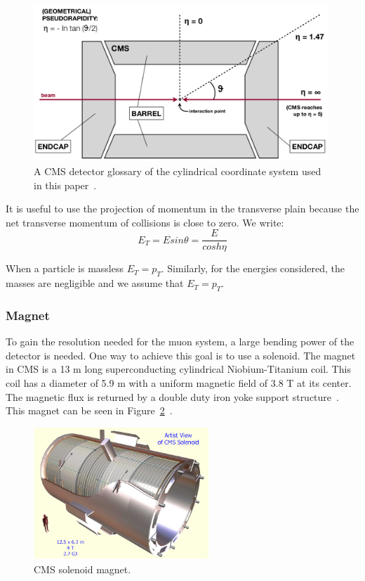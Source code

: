 \begin{figure}[htb]
\centering
\includegraphics[width=0.99\textwidth]{Experiment/DetectorGlossary.png}
\caption{A CMS detector glossary of the cylindrical coordinate system used in this paper~\cite{Pandolfi_talk}.}
\label{fig:CMS_detector_glossary}
\end{figure}

It is useful to use the projection of momentum in the transverse plain because the net transverse momentum of collisions is close to zero.  We write:
\begin{equation} E_T = E sin \theta = \dfrac{E}{cosh\eta} \label{eq:transverse_energy}\end{equation}

When a particle is massless $E_T=p_T$.  Similarly, for the energies considered, the masses are negligible and we assume that $E_T=p_T$.

\subsubsection{Magnet}

To gain the resolution needed for the muon system, a large bending power of the detector is needed.  One way to achieve this goal is to use a solenoid.  The magnet in CMS is a 13 m long superconducting cylindrical Niobium-Titanium coil.  This coil has a diameter of 5.9 m with a uniform magnetic field of 3.8 T at its center.  The magnetic flux is returned by a double duty iron yoke support structure~\cite{Magnet_CMS}. This magnet can be seen in Figure~\ref{fig:CMS_solenoid_magnet}~\cite{cms_solenoid_magnet}.

\begin{figure}[htb]
\centering
\includegraphics[width=0.59\textwidth]{Experiment/CMS-solenoid-magnet.jpg}
\caption{CMS solenoid magnet.~\cite{cms_solenoid_magnet}}
\label{fig:CMS_solenoid_magnet}
\end{figure}


